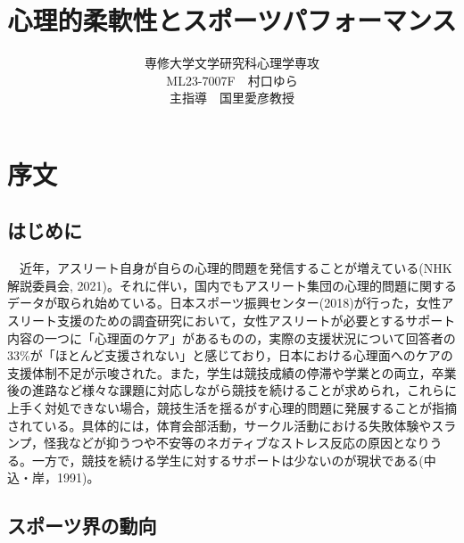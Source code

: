 \documentclass[12pt,a4paper,xelatex,ja=standard]{bxjsarticle}
\title{心理的柔軟性とスポーツパフォーマンス}
\author{専修大学文学研究科心理学専攻\\
ML23-7007F　村口ゆら\\
主指導　国里愛彦教授}
\date{}
\begin{document}
\pagestyle{empty}
\maketitle
\clearpage
{
\setcounter{tocdepth}{3}
\tableofcontents
}
\clearpage
\pagestyle{plain}
\setcounter{page}{1}

\hypertarget{ux5e8fux6587}{%
\section{序文}\label{ux5e8fux6587}}

\hypertarget{ux306fux3058ux3081ux306b}{%
\subsection{はじめに}\label{ux306fux3058ux3081ux306b}}

　近年，アスリート自身が自らの心理的問題を発信することが増えている(NHK解説委員会,
2021)。それに伴い，国内でもアスリート集団の心理的問題に関するデータが取られ始めている。日本スポーツ振興センター(2018)が行った，女性アスリート支援のための調査研究において，女性アスリートが必要とするサポート内容の一つに「心理面のケア」があるものの，実際の支援状況について回答者の33\%が「ほとんど支援されない」と感じており，日本における心理面へのケアの支援体制不足が示唆された。また，学生は競技成績の停滞や学業との両立，卒業後の進路など様々な課題に対応しながら競技を続けることが求められ，これらに上手く対処できない場合，競技生活を揺るがす心理的問題に発展することが指摘されている。具体的には，体育会部活動，サークル活動における失敗体験やスランプ，怪我などが抑うつや不安等のネガティブなストレス反応の原因となりうる。一方で，競技を続ける学生に対するサポートは少ないのが現状である(中込・岸，1991)。

\hypertarget{ux30b9ux30ddux30fcux30c4ux754cux306eux52d5ux5411}{%
\subsection{スポーツ界の動向}\label{ux30b9ux30ddux30fcux30c4ux754cux306eux52d5ux5411}}
\end{document}
